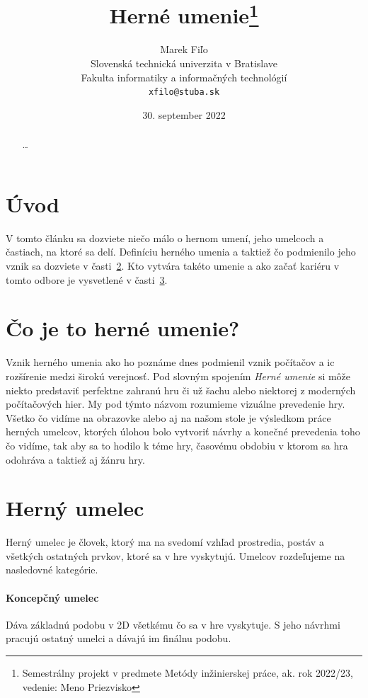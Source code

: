 \documentclass[10pt,twoside,slovak,a4paper]{article}
\title{Herné umenie\thanks{Semestrálny projekt v predmete Metódy inžinierskej práce, ak. rok 2022/23, vedenie: Meno Priezvisko}} %
\author{Marek Fiľo\\[2pt]
	{\small Slovenská technická univerzita v Bratislave}\\
	{\small Fakulta informatiky a informačných technológií}\\
	{\small \texttt{xfilo@stuba.sk}}
	}
\date{\small 30. september 2022} %
\begin{document}
\maketitle

\begin{abstract}
\ldots
\end{abstract}



\section{Úvod}

V tomto článku sa dozviete niečo málo o hernom umení, jeho umelcoch a častiach, na ktoré sa delí. Definíciu herného umenia a taktiež čo podmienilo jeho vznik sa dozviete v časti~\ref{začiatok}. Kto vytvára takéto umenie a ako začať kariéru v tomto odbore je vysvetlené v časti~\ref{pokračovanie}.





\section{Čo je to herné umenie?} \label{začiatok}
Vznik herného umenia ako ho poznáme dnes podmienil vznik počítačov a ic rozšírenie medzi širokú verejnosť.
Pod slovným spojením  \emph{Herné umenie} si môže niekto predstaviť perfektne zahranú hru či už šachu alebo niektorej z moderných počítačových hier. My pod týmto názvom rozumieme vizuálne prevedenie hry. Všetko čo vidíme na obrazovke alebo aj na našom stole je výsledkom práce herných umelcov, ktorých úlohou bolo vytvoriť návrhy a konečné prevedenia toho čo vidíme, tak aby sa to hodilo k téme hry, časovému obdobiu v ktorom sa hra odohráva a taktiež aj žánru hry.














\section{Herný umelec} \label{pokračovanie}
Herný umelec je človek, ktorý ma na svedomí vzhľad prostredia, postáv a všetkých ostatných prvkov, ktoré sa v hre vyskytujú. Umelcov rozdeľujeme na nasledovné kategórie.
\paragraph{Koncepčný umelec} Dáva základnú podobu v 2D všetkému čo sa v hre vyskytuje. S jeho návrhmi pracujú ostatný umelci a dávajú im finálnu podobu.
\end{document}
